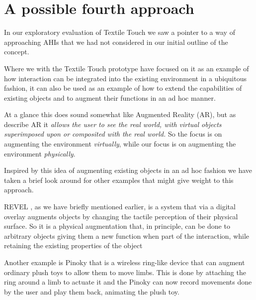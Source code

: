 \section{A possible fourth approach}

In our exploratory evaluation of Textile Touch we saw a pointer to a way of approaching AHIs that we had not considered in our initial outline of the concept.

Where we with the Textile Touch prototype have focused on it as an example of how interaction can be integrated into the existing environment in a ubiquitous fashion, it can also be used as an example of how to extend the capabilities of existing objects and to augment their functions in an ad hoc manner.

At a glance this does sound somewhat like Augmented Reality (AR), but as \citet{azuma1997survey} describe AR it \emph{allows the user to see the real world, with virtual objects superimposed upon or composited with the real world.}
So the focus is on augmenting the environment \emph{virtually}, while our focus is on augmenting the environment \emph{physically}.


Inspired by this idea of augmenting existing objects in an ad hoc fashion we have taken a brief look around for other examples that might give weight to this approach.

REVEL \citep{bau2013revel}, as we have briefly mentioned earlier, is a system that via a digital overlay augments objects by changing the tactile perception of their physical surface.
So it is a physical augmentation that, in principle, can be done to arbitrary objects giving them a new function when part of the interaction, while retaining the existing properties of the object 

Another example is Pinoky \citep{sugiura2012pinoky} that is a wireless ring-like device that can augment ordinary plush toys to allow them to move limbs.
This is done by attaching the ring around a limb to actuate it and the Pinoky can now record movements done by the user and play them back, animating the plush toy.

